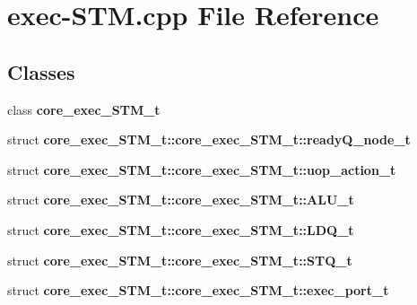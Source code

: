 \section{exec-STM.cpp File Reference}
\label{exec-STM_8cpp}
\subsection*{Classes}
\begin{CompactItemize}
\item 
class {\bf core\_\-exec\_\-STM\_\-t}
\item 
struct {\bf core\_\-exec\_\-STM\_\-t::core\_\-exec\_\-STM\_\-t::readyQ\_\-node\_\-t}
\item 
struct {\bf core\_\-exec\_\-STM\_\-t::core\_\-exec\_\-STM\_\-t::uop\_\-action\_\-t}
\item 
struct {\bf core\_\-exec\_\-STM\_\-t::core\_\-exec\_\-STM\_\-t::ALU\_\-t}
\item 
struct {\bf core\_\-exec\_\-STM\_\-t::core\_\-exec\_\-STM\_\-t::LDQ\_\-t}
\item 
struct {\bf core\_\-exec\_\-STM\_\-t::core\_\-exec\_\-STM\_\-t::STQ\_\-t}
\item 
struct {\bf core\_\-exec\_\-STM\_\-t::core\_\-exec\_\-STM\_\-t::exec\_\-port\_\-t}
\end{CompactItemize}
